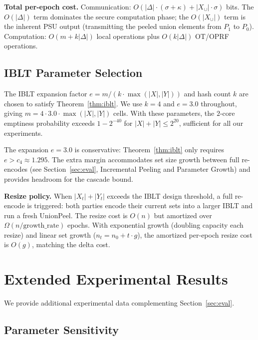 \smallskip\noindent\textbf{Total per-epoch cost.}
Communication: $O(|\Delta| \cdot (\sigma + \kappa) + |X_{\cup}| \cdot
\sigma)$ bits. The $O(|\Delta|)$ term dominates the secure computation
phase; the $O(|X_{\cup}|)$ term is the inherent PSU output (transmitting the
peeled union elements from $P_1$ to $P_0$). Computation: $O(m + k|\Delta|)$
local operations plus $O(k|\Delta|)$ OT/OPRF operations.

\subsection{IBLT Parameter Selection}

The IBLT expansion factor $e = m/(k \cdot \max(|X|, |Y|))$ and hash count
$k$ are chosen to satisfy Theorem~\ref{thm:iblt}. We use $k = 4$ and
$e = 3.0$ throughout, giving $m = 4 \cdot 3.0 \cdot \max(|X|, |Y|)$ cells.
With these parameters, the $2$-core emptiness probability exceeds
$1 - 2^{-40}$ for $|X| + |Y| \leq 2^{20}$, sufficient for all our
experiments.

The expansion $e = 3.0$ is conservative: Theorem~\ref{thm:iblt} only requires
$e > c_4 \approx 1.295$. The extra margin accommodates set size growth between
full re-encodes (see Section~\ref{sec:eval}, Incremental Peeling and Parameter
Growth) and provides headroom for the cascade bound.

\smallskip\noindent\textbf{Resize policy.}
When $|X_t| + |Y_t|$ exceeds the IBLT design threshold, a full re-encode is
triggered: both parties encode their current sets into a larger IBLT and run
a fresh UnionPeel. The resize cost is $O(n)$ but amortized over
$\Omega(n/\text{growth\_rate})$ epochs. With exponential growth (doubling
capacity each resize) and linear set growth ($n_t = n_0 + t \cdot g$), the
amortized per-epoch resize cost is $O(g)$, matching the delta cost.

\section{Extended Experimental Results}
\label{sec:ext-eval}

We provide additional experimental data complementing
Section~\ref{sec:eval}.

\subsection{Parameter Sensitivity}

